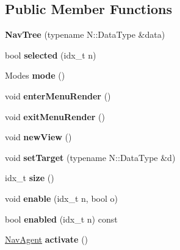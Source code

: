 \subsection*{Public Member Functions}
\begin{DoxyCompactItemize}
\item 
\mbox{\label{classNavTree_a2a48108c76faeb32b167fef420807cd1}} 
{\bfseries Nav\+Tree} (typename N\+::\+Data\+Type \&data)
\item 
\mbox{\label{classNavTree_a44d2ba788071454919fd6adf367f14cf}} 
bool {\bfseries selected} (idx\+\_\+t n)
\item 
\mbox{\label{classNavTree_a7a52f5828647ac8a728b6e0e99af69db}} 
Modes {\bfseries mode} ()
\item 
\mbox{\label{classNavTree_a6526a911469b2fe3ddae9014c29d1b7d}} 
void {\bfseries enter\+Menu\+Render} ()
\item 
\mbox{\label{classNavTree_a3cec525c27483a885de1b0fea0294d37}} 
void {\bfseries exit\+Menu\+Render} ()
\item 
\mbox{\label{classNavTree_a76175fb2ee608101070059cbcbf64cae}} 
void {\bfseries new\+View} ()
\item 
\mbox{\label{classNavTree_a66d20c73fdb688e79cdc3b1109e5deb2}} 
void {\bfseries set\+Target} (typename N\+::\+Data\+Type \&d)
\item 
\mbox{\label{classNavTree_a1cd4f55c3bb50895c8830632f04117d1}} 
idx\+\_\+t {\bfseries size} ()
\item 
\mbox{\label{classNavTree_a7e4c8184eae898e217f6a3a2e3fbf792}} 
void {\bfseries enable} (idx\+\_\+t n, bool o)
\item 
\mbox{\label{classNavTree_a31ae4b2cb9f8eaf73f878c0fe9c0c953}} 
bool {\bfseries enabled} (idx\+\_\+t n) const
\item 
\mbox{\label{classNavTree_aac8b96a359ec9f8f0952e74b67ef48fd}} 
\hyperlink{structNavAgent}{Nav\+Agent} {\bfseries activate} ()

\end{DoxyCompactItemize}

